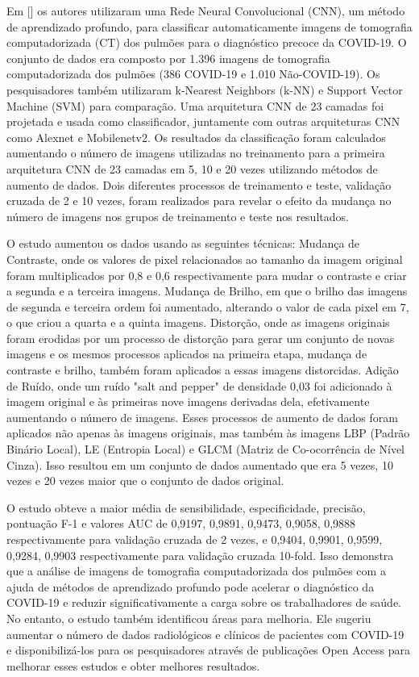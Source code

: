 Em [] os autores utilizaram uma Rede Neural Convolucional (CNN), um método de aprendizado profundo, para classificar automaticamente imagens de tomografia computadorizada (CT) dos pulmões para o diagnóstico precoce da COVID-19. O conjunto de dados era composto por 1.396 imagens de tomografia computadorizada dos pulmões (386 COVID-19 e 1.010 Não-COVID-19). Os pesquisadores também utilizaram k-Nearest Neighbors (k-NN) e Support Vector Machine (SVM) para comparação. Uma arquitetura CNN de 23 camadas foi projetada e usada como classificador, juntamente com outras arquiteturas CNN como Alexnet e Mobilenetv2. Os resultados da classificação foram calculados aumentando o número de imagens utilizadas no treinamento para a primeira arquitetura CNN de 23 camadas em 5, 10 e 20 vezes utilizando métodos de aumento de dados. Dois diferentes processos de treinamento e teste, validação cruzada de 2 e 10 vezes, foram realizados para revelar o efeito da mudança no número de imagens nos grupos de treinamento e teste nos resultados.

O estudo aumentou os dados usando as seguintes técnicas: Mudança de Contraste, onde os valores de pixel relacionados ao tamanho da imagem original foram multiplicados por 0,8 e 0,6 respectivamente para mudar o contraste e criar a segunda e a terceira imagens. Mudança de Brilho, em que o brilho das imagens de segunda e terceira ordem foi aumentado, alterando o valor de cada pixel em 7, o que criou a quarta e a quinta imagens. Distorção, onde as imagens originais foram erodidas por um processo de distorção para gerar um conjunto de novas imagens e os mesmos processos aplicados na primeira etapa, mudança de contraste e brilho, também foram aplicados a essas imagens distorcidas. Adição de Ruído, onde um ruído "salt and pepper" de densidade 0,03 foi adicionado à imagem original e às primeiras nove imagens derivadas dela, efetivamente aumentando o número de imagens. Esses processos de aumento de dados foram aplicados não apenas às imagens originais, mas também às imagens LBP (Padrão Binário Local), LE (Entropia Local) e GLCM (Matriz de Co-ocorrência de Nível Cinza). Isso resultou em um conjunto de dados aumentado que era 5 vezes, 10 vezes e 20 vezes maior que o conjunto de dados original.

O estudo obteve a maior média de sensibilidade, especificidade, precisão, pontuação F-1 e valores AUC de 0,9197, 0,9891, 0,9473, 0,9058, 0,9888 respectivamente para validação cruzada de 2 vezes, e 0,9404, 0,9901, 0,9599, 0,9284, 0,9903 respectivamente para validação cruzada 10-fold. Isso demonstra que a análise de imagens de tomografia computadorizada dos pulmões com a ajuda de métodos de aprendizado profundo pode acelerar o diagnóstico da COVID-19 e reduzir significativamente a carga sobre os trabalhadores de saúde. No entanto, o estudo também identificou áreas para melhoria. Ele sugeriu aumentar o número de dados radiológicos e clínicos de pacientes com COVID-19 e disponibilizá-los para os pesquisadores através de publicações Open Access para melhorar esses estudos e obter melhores resultados.

